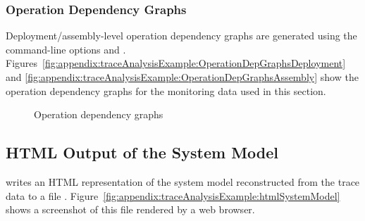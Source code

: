 \pagebreak

\subsubsection{Operation Dependency Graphs}

Deployment/assembly-level operation dependency graphs are generated using the %
command-line options \OPT{\OPTplotDeploymentOperationDependencyGraph} and %
\OPT{\OPTplotAssemblyOperationDependencyGraph}. %
Figures~\ref{fig:appendix:traceAnalysisExample:OperationDepGraphsDeployment} and %
\ref{fig:appendix:traceAnalysisExample:OperationDepGraphsAssembly} show the %
operation dependency graphs for the monitoring data used in this section. 

\begin{figure}[ht]\centering
{}
\caption{Operation dependency graphs}
\label{fig:appendix:traceAnalysisExample:OperationDepGraphs}
\end{figure}

\pagebreak

\subsection{HTML Output of the System Model}

\KiekerTraceAnalysis{} writes an HTML representation of the system model reconstructed %
from the trace data to a file . %
Figure~\ref{fig:appendix:traceAnalysisExample:htmlSystemModel} shows a screenshot %
of this file rendered by a web browser.

